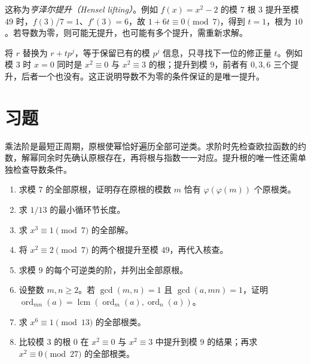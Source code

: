 这称为\emph{亨泽尔提升（Hensel lifting）}。例如 $f(x)=x^2-2$ 的模 $7$ 根 $3$ 提升至模 $49$ 时，$f(3)/7=1$、$f'(3)=6$，故 $1+6t\equiv0\pmod7$，得到 $t=1$，根为 $10$。若导数为零，则可能无提升，也可能有多个提升，需重新求解。

将 $r$ 替换为 $r+tp^j$，等于保留已有的模 $p^j$ 信息，只寻找下一位的修正量 $t$。例如模 $3$ 时 $x=0$ 同时是 $x^2\equiv0$ 与 $x^2\equiv3$ 的根；提升到模 $9$，前者有 $0,3,6$ 三个提升，后者一个也没有。这正说明导数不为零的条件保证的是唯一提升。

\section{习题}

乘法阶是最短正周期，原根使幂恰好遍历全部可逆类。求阶时先检查欧拉函数的约数，解幂同余时先确认原根存在，再将根与指数一一对应。提升根的唯一性还需单独检查导数条件。

\begin{enumerate}
 \item 求模 $7$ 的全部原根，证明存在原根的模数 $m$ 恰有 $\varphi(\varphi(m))$ 个原根类。
 \item 求 $1/13$ 的最小循环节长度。
 \item 求 $x^3\equiv1\pmod7$ 的全部解。
 \item 将 $x^2\equiv2\pmod7$ 的两个根提升至模 $49$，再代入核查。
 \item\label{ex:order-list} 求模 $9$ 的每个可逆类的阶，并列出全部原根。
 \item\label{ex:order-composite} 设整数 $m,n\ge2$。若 $\gcd(m,n)=1$ 且 $\gcd(a,mn)=1$，证明 $\operatorname{ord}_{mn}(a)=\operatorname{lcm}(\operatorname{ord}_m(a),\operatorname{ord}_n(a))$。
 \item\label{ex:order-sixth} 求 $x^6\equiv1\pmod{13}$ 的全部根类。
 \item\label{ex:order-singular} 比较模 $3$ 的根 $0$ 在 $x^2\equiv0$ 与 $x^2\equiv3$ 中提升到模 $9$ 的结果；再求 $x^2\equiv0\pmod{27}$ 的全部根类。
\end{enumerate}

